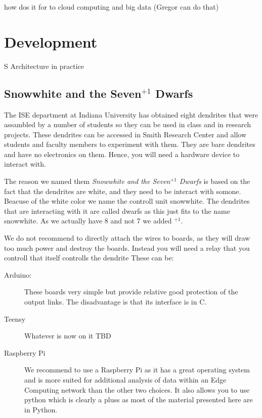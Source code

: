 how dos it for to cloud computing and big data (Gregor can do that)


\section{Development}
S Architecture in practice


\subsection{Snowwhite and the Seven$^{+1}$ Dwarfs}

The ISE department at Indiana University has obtained eight dendrites
that were assambled by a number of students so they can be used in
class and in research projects. These dendrites can be accessed in
Smith Research Center and allow students and faculty members to
experiment with them. They are bare dendrites and have no
electronics on them. Hence, you will need a hardware device to
interact with.

The reason we named them {\em Snowwhite and the Seven$^{+1}$ Dwarfs}
is based on the fact that the dendrites are white, and they need to be
interact with  somone. Beacuse of the white color we name the controll
unit snowwhite. The dendrites that are interacting with it are called
dwarfs as this just fits to the name snowwhite. As we actually have 8
and not 7 we added $^{+1}$.


We do not recommend to directly attach the
wires to boards, as they will draw too much power and destroy the
boards. Instead you will need a relay that you controll that itself
controlls the dendrite These can be:

\begin{description}

\item[Arduino:] These boards very simple but provide relative good
  protection of the output links. The disadvantage is that its
  interface is in C.

\item[Teensy] Whatever is now on it TBD

\item[Raspberry Pi] We recommend to use a Raspberry Pi as it has a
  great operating system and is more suited for additional analysis of
  data within an Edge Computing network than the other two choices. It
  also allows you to use python which is clearly a pluss as most of
  the material presented here are in Python.

\end{description}



